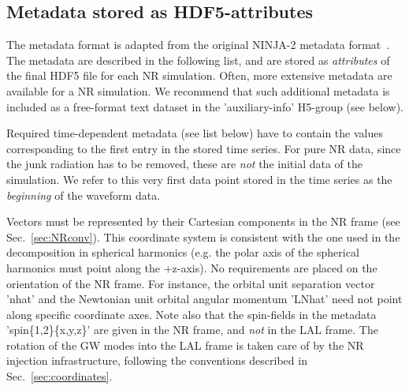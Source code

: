 \documentclass[11pt,tightenlines,article,amssymb,amsmath,amsfonts,superscriptaddress,nofootinbib]{revtex4}
\newcommand{\red}{\textcolor{red}}
\newcommand{\patricia}[1]{\textcolor{blue}{\textit{Patricia: #1}}}
\newcommand{\tGW}{t_{\rm GW}}
\begin{document}


\subsection{Metadata stored as HDF5-attributes}
\label{sec:meta}
The metadata format is adapted from the original NINJA-2 metadata format~\cite{Brown:2007jx}. The metadata are described in the following list, and are stored as \emph{attributes} of the final HDF5 file for each NR simulation. Often, more extensive metadata are available for a NR simulation. We recommend that such additional metadata is included as a free-format text dataset in the 'auxiliary-info' H5-group (see below). 

Required time-dependent metadata (see list below) have to contain the values corresponding to the first entry in the stored time series. For pure NR data, since the junk radiation has to be removed, these are \emph{not} the initial data of the simulation. We refer to this very first data point stored in the time series as the \emph{beginning} of the waveform data. 

Vectors must be represented by their Cartesian components in the NR frame (see Sec.~\ref{sec:NRconv}). This coordinate system is consistent with the one used in the decomposition in spherical harmonics (e.g. the polar axis of the spherical harmonics must point along the +z-axis). No requirements are placed on the orientation of the NR frame. For instance, the orbital unit separation vector 'nhat' and the Newtonian unit orbital angular momentum 'LNhat' need not point along specific coordinate axes. Note also that the spin-fields in the metadata 'spin\{1,2\}\{x,y,z\}' are given in the NR frame, and \emph{not} in the LAL frame. The rotation of the GW modes into the LAL frame is taken care of by the NR injection infrastructure, following the conventions described in Sec.~\ref{sec:coordinates}. 
\end{document}
